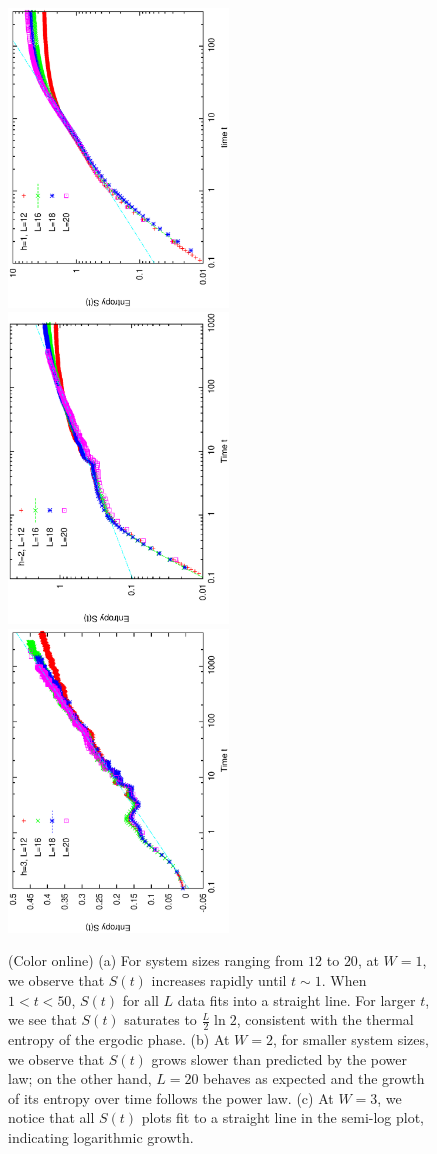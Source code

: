 \documentclass[prl,aps,epsf,showpacs,twocolumn,letterpaper]{revtex4}
\begin{document}
\begin{figure}[t]
	\centering
	\includegraphics[angle=-90,width=2.3in]{newfig1c.ps}
	\includegraphics[angle=-90,width=2.3in]{newfig1d.ps}
	\includegraphics[angle=-90,width=2.3in]{newfig1e.ps}
	\caption{
		(Color online) (a) For system sizes ranging from $12$ to $20$, at $W=1$, we observe that $S(t)$ increases rapidly until $t \sim 1$.  When $1<t<50$, $S(t)$ for all $L$ data fits into a straight line.  For larger $t$, we see that $S(t)$ saturates to $\frac{L}{2} \ln{2}$,  consistent with the thermal entropy of the ergodic phase. (b) At $W=2$, for smaller system sizes, we observe that $S(t)$ grows slower than predicted by the power law; on the other hand, $L=20$ behaves as expected and the growth of its entropy over time follows the power law. (c) At $W=3$, we notice that all $S(t)$ plots fit to a straight line in the semi-log plot, indicating logarithmic growth.}
	\label{fig3}
\end{figure}
\end{document}
